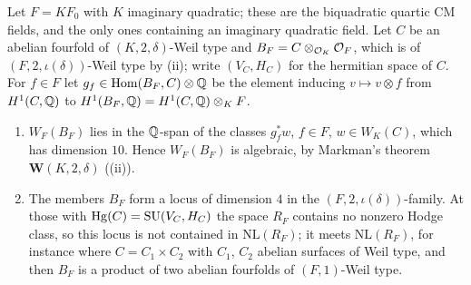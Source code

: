 \begin{proposition}
\label{prop:quarticscalar}
Let $F=KF_{0}$ with $K$ imaginary quadratic; these are the biquadratic
quartic CM fields, and the only ones containing an imaginary quadratic field.
Let $C$ be an abelian fourfold of $(K,2,\delta)$-Weil type and
$B_{F}=C\otimes_{\mathcal{O}_{K}}\mathcal{O}_{F}$, which is of $(F,2,\iota(\delta))$-Weil type by
(ii); write $(V_{C},H_{C})$ for the hermitian space of $C$.
For $f\in F$ let $g_{f}\in\operatorname{Hom}(B_{F},C)\otimes\mathbb{Q}$ be the element inducing
$v\mapsto v\otimes f$ from $H^{1}(C,\mathbb{Q})$ to
$H^{1}(B_{F},\mathbb{Q})=H^{1}(C,\mathbb{Q})\otimes_{K}F$.
\begin{enumerate}[label=\textup{(\roman*)},leftmargin=2.6em,itemsep=2pt]
\item $W_{F}(B_{F})$ lies in the $\mathbb{Q}$-span of the classes $g_{f}^{*}w$, $f\in F$,
  $w\in W_{K}(C)$, which has dimension $10$. Hence $W_{F}(B_{F})$ is
  algebraic, by Markman's theorem $\mathbf{W}(K,2,\delta)$ \cite{Mar25a}
  ((ii)).
\item The members $B_{F}$ form a locus of dimension $4$ in the
  $(F,2,\iota(\delta))$-family. At those with $\operatorname{Hg}(C)=\operatorname{SU}(V_{C},H_{C})$ the
  space $R_{F}$ contains no nonzero Hodge class, so
  this locus is not contained in $\mathrm{NL}(R_{F})$; it meets
  $\mathrm{NL}(R_{F})$, for instance where $C=C_{1}\times C_{2}$ with $C_{1}$,
  $C_{2}$ abelian surfaces of Weil type, and then $B_{F}$ is a product of two
  abelian fourfolds of $(F,1)$-Weil type.
\end{enumerate}
\end{proposition}

